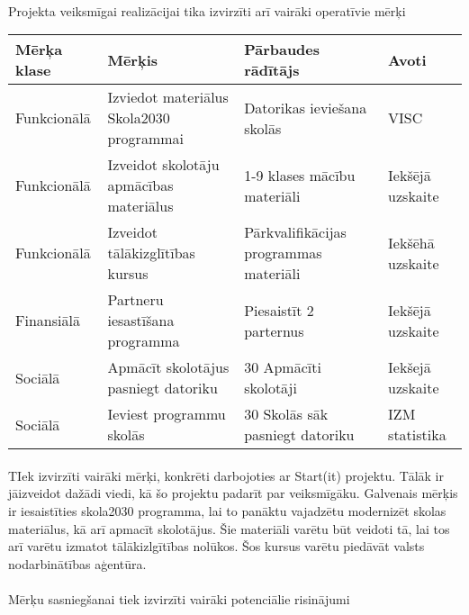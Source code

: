 \paragraph{}
Projekta veiksmīgai realizācijai tika izvirzīti arī vairāki operatīvie mērķi
\begin{table}[h!]
    \centering
    \begin{tabular}{|l|p{6cm}|p{5cm}|p{2cm}|}
        \hline
        \textbf{Mērķa klase} & \textbf{Mērķis} & \textbf{Pārbaudes rādītājs} & \textbf{Avoti} \\
        \hline
        Funkcionālā & Izviedot materiālus Skola2030 programmai & Datorikas ieviešana skolās & VISC \\
        \hline
        Funkcionālā & Izveidot skolotāju apmācības materiālus & 1-9 klases mācību materiāli & Iekšējā uzskaite \\
        \hline
        Funkcionālā & Izveidot tālākizglītības kursus & Pārkvalifikācijas programmas materiāli & Iekšēhā uzskaite \\
        \hline
        Finansiālā & Partneru iesastīšana programma & Piesaistīt 2 parternus & Iekšējā uzskaite \\
        \hline
        Sociālā & Apmācīt skolotājus pasniegt datoriku & 30 Apmācīti skolotāji & Iekšejā uzskaite \\
        \hline
        Sociālā & Ieviest programmu skolās & 30 Skolās sāk pasniegt datoriku & IZM statistika \\
        \hline 
    \end{tabular}
\end{table}
\paragraph{}
TIek izvirzīti vairāki mērķi, konkrēti darbojoties ar Start(it) projektu. Tālāk ir jāizveidot dažādi viedi, kā
šo projektu padarīt par veiksmīgāku. Galvenais mērķis ir iesaistīties skola2030 programma, lai to panāktu vajadzētu
modernizēt skolas materiālus, kā arī apmacīt skolotājus. Šie materiāli varētu būt veidoti tā, lai tos arī varētu
izmatot tālākizlgītības nolūkos. Šos kursus varētu piedāvāt valsts nodarbinātības aģentūra.
\paragraph{}
Mērķu sasniegšanai tiek izvirzīti vairāki potenciālie risinājumi
